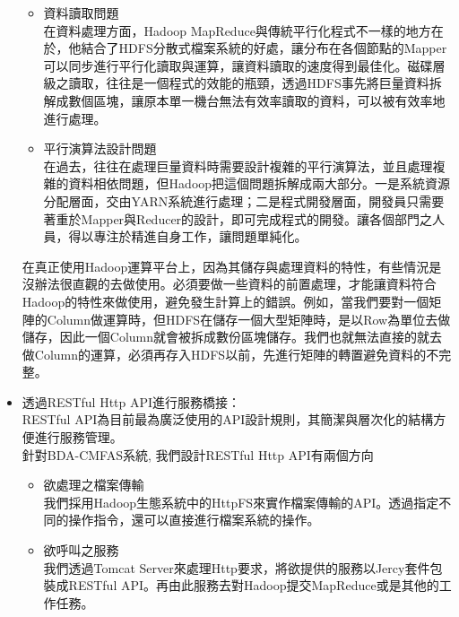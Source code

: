 \documentclass[CJK,12pt,t]{article}
\begin{document}
\begin{CJK*}{UTF8}{bkai}
\begin{itemize}
\begin{itemize}
						\item 資料讀取問題\\
							在資料處理方面，Hadoop MapReduce與傳統平行化程式不一樣的地方在於，他結合了HDFS分散式檔案系統的好處，讓分布在各個節點的Mapper可以同步進行平行化讀取與運算，讓資料讀取的速度得到最佳化。磁碟層級之讀取，往往是一個程式的效能的瓶頸，透過HDFS事先將巨量資料拆解成數個區塊，讓原本單一機台無法有效率讀取的資料，可以被有效率地進行處理。\\

						\item 平行演算法設計問題\\
							在過去，往往在處理巨量資料時需要設計複雜的平行演算法，並且處理複雜的資料相依問題，但Hadoop把這個問題拆解成兩大部分。一是系統資源分配層面，交由YARN系統進行處理；二是程式開發層面，開發員只需要著重於Mapper與Reducer的設計，即可完成程式的開發。讓各個部門之人員，得以專注於精進自身工作，讓問題單純化。
					\end{itemize}
				在真正使用Hadoop運算平台上，因為其儲存與處理資料的特性，有些情況是沒辦法很直觀的去做使用。必須要做一些資料的前置處理，才能讓資料符合Hadoop的特性來做使用，避免發生計算上的錯誤。例如，當我們要對一個矩陣的Column做運算時，但HDFS在儲存一個大型矩陣時，是以Row為單位去做儲存，因此一個Column就會被拆成數份區塊儲存。我們也就無法直接的就去做Column的運算，必須再存入HDFS以前，先進行矩陣的轉置避免資料的不完整。


			\item 透過RESTful Http API進行服務橋接：\\
				RESTful API為目前最為廣泛使用的API設計規則，其簡潔與層次化的結構方便進行服務管理。\\
				針對BDA-CMFAS系統, 我們設計RESTful Http API有兩個方向
				\begin{itemize}
					\setlength{\itemsep}{5pt}
						\item 欲處理之檔案傳輸\\
							我們採用Hadoop生態系統中的HttpFS來實作檔案傳輸的API。透過指定不同的操作指令，還可以直接進行檔案系統的操作。
						\item 欲呼叫之服務\\
							我們透過Tomcat Server來處理Http要求，將欲提供的服務以Jercy套件包裝成RESTful API。再由此服務去對Hadoop提交MapReduce或是其他的工作任務。

				\end{itemize}
		\end{itemize}


\end{CJK*}
\end{document}

